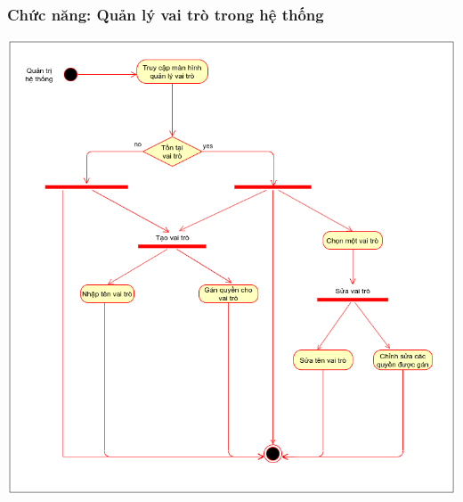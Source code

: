\subsubsection{Chức năng: Quản lý vai trò trong hệ thống}
\begin{center}
  \captionsetup{type=figure}
  \includegraphics[width=15cm]{img/UML/Admin/addRole.png}
\end{center}

